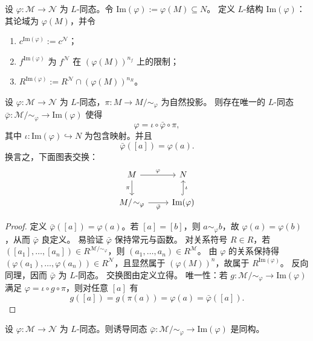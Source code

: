 \documentclass[lang=cn,a4paper,newtx,section]{elegantbook}
\begin{document}
\begin{definition}[像结构]
设 $\varphi:\mathcal M\to\mathcal N$ 为 $L$-同态。令 $\mathrm{Im}(\varphi):=\varphi(M)\subseteq N$。
定义 $L$-结构 $\mathrm{Im}(\varphi)$：其论域为 $\varphi(M)$，并令
\begin{enumerate}
  \item $c^{\mathrm{Im}(\varphi)}:=c^{\mathcal N}$；
  \item $f^{\mathrm{Im}(\varphi)}$ 为 $f^{\mathcal N}$ 在 $(\varphi(M))^{n_f}$ 上的限制；
  \item $R^{\mathrm{Im}(\varphi)}:=R^{\mathcal N}\cap (\varphi(M))^{n_R}$。
\end{enumerate}
\end{definition}

\begin{proposition}[诱导同态]
设 $\varphi:\mathcal M\to\mathcal N$ 为 $L$-同态，$\pi:M\to M/\!\sim_{\varphi}$ 为自然投影。
则存在唯一的 $L$-同态 $\bar\varphi:\mathcal M/\!\sim_{\varphi}\to\mathrm{Im}(\varphi)$ 使得
\[
  \varphi=\iota\circ\bar\varphi\circ\pi,
\]
其中 $\iota:\mathrm{Im}(\varphi)\hookrightarrow N$ 为包含映射。并且
\[
  \bar\varphi([a])=\varphi(a).
\]
换言之，下面图表交换：
\[
\begin{tikzcd}
M \arrow[r, "\varphi"] \arrow[d, "\pi"'] & N \\
M/\!\sim_{\varphi} \arrow[r, "\bar\varphi"'] & \mathrm{Im}(\varphi) \arrow[u, hook, "\iota"']
\end{tikzcd}
\]
\end{proposition}

\begin{proof}
定义 $\bar\varphi([a])=\varphi(a)$。若 $[a]=[b]$，则 $a\sim_{\varphi} b$，故 $\varphi(a)=\varphi(b)$，从而 $\bar\varphi$ 良定义。
易验证 $\bar\varphi$ 保持常元与函数。
对关系符号 $R\in R$，若 $([a_1],\dots,[a_n])\in R^{\mathcal M/\!\sim_{\varphi}}$，则 $(a_1,\dots,a_n)\in R^{\mathcal M}$。
由 $\varphi$ 的关系保持得 $(\varphi(a_1),\dots,\varphi(a_n))\in R^{\mathcal N}$，且显然属于 $(\varphi(M))^{n}$，故属于 $R^{\mathrm{Im}(\varphi)}$。
反向同理，因而 $\bar\varphi$ 为 $L$-同态。
交换图由定义立得。
唯一性：若 $g:\mathcal M/\!\sim_{\varphi}\to\mathrm{Im}(\varphi)$ 满足 $\varphi=\iota\circ g\circ\pi$，则对任意 $[a]$ 有
\[
  g([a])=g(\pi(a))=\varphi(a)=\bar\varphi([a]).
\]
\end{proof}

\begin{theorem}[第一同构定理]
设 $\varphi:\mathcal M\to\mathcal N$ 为 $L$-同态。则诱导同态 $\bar\varphi:\mathcal M/\!\sim_{\varphi}\to\mathrm{Im}(\varphi)$ 是同构。
\end{theorem}
\end{document}
